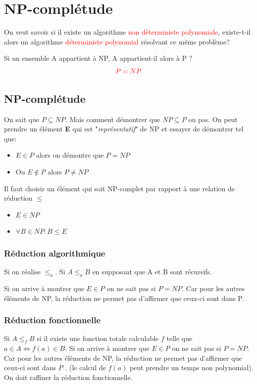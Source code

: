 \documentclass{report}
\begin{document}
\chapter{NP-complétude}
On veut savoir si il existe un algorithme \textcolor{red}{non déterministe polynomiale}, existe-t-il alors un algorithme \textcolor{red}{déterministe polynomial} résolvant ce même problème?\par 
Si un ensemble A appartient à NP, A appartient-il alors à P ?
\begin{equation}
\textcolor{red}{P = NP}
\end{equation}

\section{NP-complétude}
On sait que $P \subseteq NP$. Mais comment démontrer que $NP \subseteq P$ ou pas. On peut prendre un élément \textbf{E} qui est "\textit{représentatif}" de NP et essayer de démontrer tel que:
\begin{itemize}
\item $E \in P$ alors on démontre que $P = NP$
\item Ou $E \notin P$ alors $P \neq NP$
\end{itemize}
Il faut choisir un élément qui soit NP-complet par rapport à une relation de réduction $\leq$
\begin{itemize}
\item $E \in NP$
\item $\forall B \in NP: B \leq E$
\end{itemize}

\subsection{Réduction algorithmique}
Si on réalise $\leq_a$. Si $A \leq_a B$ en supposant que A et B sont récursifs.\par 
Si on arrive à montrer que $E \in P$ on ne sait pas si $P = NP$. Car pour les autres éléments de NP, la réduction ne permet pas d'affirmer que ceux-ci sont dans P.

\subsection{Réduction fonctionnelle}
Si $A \leq_f B$ si il existe une fonction totale calculable $f$ telle que $a \in A \Leftrightarrow f(a) \in B$. Si on arrive à montrer que $E \in P$ on ne sait pas si $P = NP$. Car pour les autres éléments de NP, la réduction ne permet pas d'affirmer que ceux-ci sont dans $P$ . (le calcul de $f(a)$ peut prendre un temps non polynomial). On doit raffiner la réduction fonctionnelle.
\end{document}
